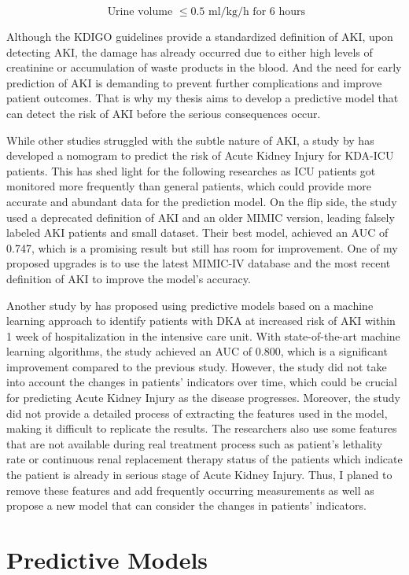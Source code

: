 \documentclass[../main.tex]{subfiles}
\begin{document}
\begin{equation}
    \text{ Urine volume } \le 0.5 \text{ ml/kg/h for 6 hours}
\end{equation}

Although the KDIGO guidelines provide a standardized definition of AKI, upon detecting AKI, the damage has already occurred due to either high levels of creatinine or accumulation of waste products in the blood.
And the need for early prediction of AKI is demanding to prevent further complications and improve patient outcomes.
That is why my thesis aims to develop a predictive model that can detect the risk of AKI before the serious consequences occur.

While other studies struggled with the subtle nature of AKI, a study by \citeauthor{monogram-aki-dka} has developed a nomogram to predict the risk of Acute Kidney Injury for KDA-ICU patients.
This has shed light for the following researches as ICU patients got monitored more frequently than general patients, which could provide more accurate and abundant data for the prediction model.
On the flip side, the study used a deprecated definition of AKI and an older MIMIC version, leading falsely labeled AKI patients and small dataset.
Their best model, achieved an AUC of 0.747, which is a promising result but still has room for improvement.
One of my proposed upgrades is to use the latest MIMIC-IV database and the most recent definition of AKI to improve the model's accuracy.

Another study by \citeauthor{xgboost-aki-dka} has proposed using predictive models based on a machine learning approach to identify patients with DKA at increased risk of AKI within 1 week of hospitalization in the intensive care unit.
With state-of-the-art machine learning algorithms, the study achieved an AUC of 0.800, which is a significant improvement compared to the previous study.
However, the study did not take into account the changes in patients' indicators over time, which could be crucial for predicting Acute Kidney Injury as the disease progresses. 
Moreover, the study did not provide a detailed process of extracting the features used in the model, making it difficult to replicate the results.
The researchers also use some features that are not available during real treatment process such as patient's lethality rate or continuous renal replacement therapy status of the patients which indicate the patient is already in serious stage of Acute Kidney Injury.
Thus, I planed to remove these features and add frequently occurring measurements as well as propose a new model that can consider the changes in patients' indicators.


\section{Predictive Models}
\end{document}
